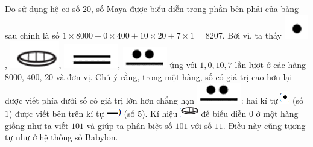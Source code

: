 	Do sử dụng hệ cơ số $20$,  số Maya được biểu diễn trong phần bên phải của bảng  sau chính là số  $1\times 8000+ 0\times 400+ 10\times20+ 7\times1= 8207$. Bởi vì, ta  thấy  \includegraphics[scale=0.5]{33},  \includegraphics[scale=0.5]{34},  \includegraphics[scale=0.5]{35}, \includegraphics[scale=0.5]{36}  ứng với $1, 0, 10, 7$  lần lượt ở các hàng $8000$, $400$, $20$ và đơn vị. Chú ý rằng, trong một hàng, số có giá trị cao hơn lại được viết phía dưới số có giá trị lớn hơn chẳng hạn  \includegraphics[scale=0.5]{36}:  hai kí tự \includegraphics{37} (số $1$) được viết bên trên kí tự \includegraphics{38} (số $5$). Kí hiệu \includegraphics{39} để biểu diễn $0$ ở một hàng giống như ta viết $101$ và giúp ta phân biệt số $101$ với số $11$. Điều này cũng tương tự như ở hệ thống số Babylon. 
